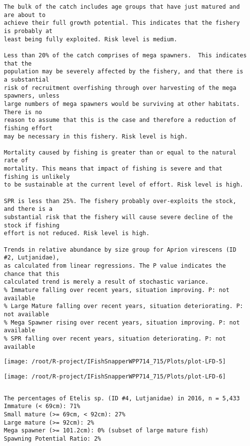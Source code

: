 \documentclass{report}\usepackage[]{graphicx}\usepackage[]{color}
\makeatletter
\def\maxwidth{ %
  \ifdim\Gin@nat@width>\linewidth
    \linewidth
  \else
    \Gin@nat@width
  \fi
}
\newenvironment{kframe}{%
 \def\at@end@of@kframe{}%
 \ifinner\ifhmode%
  \def\at@end@of@kframe{\end{minipage}}%
  \begin{minipage}{\columnwidth}%
 \fi\fi%
 \def\FrameCommand##1{\hskip\@totalleftmargin \hskip-\fboxsep
 \colorbox{shadecolor}{##1}\hskip-\fboxsep
     \hskip-\linewidth \hskip-\@totalleftmargin \hskip\columnwidth}%
 \MakeFramed {\advance\hsize-\width
   \@totalleftmargin\z@ \linewidth\hsize
   \@setminipage}}%
 {\par\unskip\endMakeFramed%
 \at@end@of@kframe}
\newenvironment{knitrout}{}{} %
\makeatother
\begin{document}
\begin{knitrout}
\begin{kframe}
\begin{verbatim}
The bulk of the catch includes age groups that have just matured and are about to
achieve their full growth potential. This indicates that the fishery is probably at
least being fully exploited. Risk level is medium.

Less than 20% of the catch comprises of mega spawners.  This indicates that the
population may be severely affected by the fishery, and that there is a substantial
risk of recruitment overfishing through over harvesting of the mega spawners, unless
large numbers of mega spawners would be surviving at other habitats. There is no
reason to assume that this is the case and therefore a reduction of fishing effort
may be necessary in this fishery. Risk level is high.
 
Mortality caused by fishing is greater than or equal to the natural rate of
mortality. This means that impact of fishing is severe and that fishing is unlikely
to be sustainable at the current level of effort. Risk level is high.
 
SPR is less than 25%. The fishery probably over-exploits the stock, and there is a
substantial risk that the fishery will cause severe decline of the stock if fishing
effort is not reduced. Risk level is high.
 
Trends in relative abundance by size group for Aprion virescens (ID #2, Lutjanidae),
as calculated from linear regressions. The P value indicates the chance that this
calculated trend is merely a result of stochastic variance.
% Immature falling over recent years, situation improving. P: not available
% Large Mature falling over recent years, situation deteriorating. P: not available
% Mega Spawner rising over recent years, situation improving. P: not available
% SPR falling over recent years, situation deteriorating. P: not available
\end{verbatim}
\end{kframe}
\texttt{[image: /root/R-project/IFishSnapperWPP714\_715/Plots/plot-LFD-5]} 

\texttt{[image: /root/R-project/IFishSnapperWPP714\_715/Plots/plot-LFD-6]} 
\begin{kframe}\begin{verbatim}
\end{verbatim}
\end{kframe}
\clearpage
\newpage
\begin{kframe}\begin{verbatim}The percentages of Etelis sp. (ID #4, Lutjanidae) in 2016, n = 5,433
Immature (< 69cm): 71%
Small mature (>= 69cm, < 92cm): 27%
Large mature (>= 92cm): 2%
Mega spawner (>= 101.2cm): 0% (subset of large mature fish)
Spawning Potential Ratio: 2%
 

\end{verbatim}
\end{kframe}
\end{knitrout}
\end{document}
